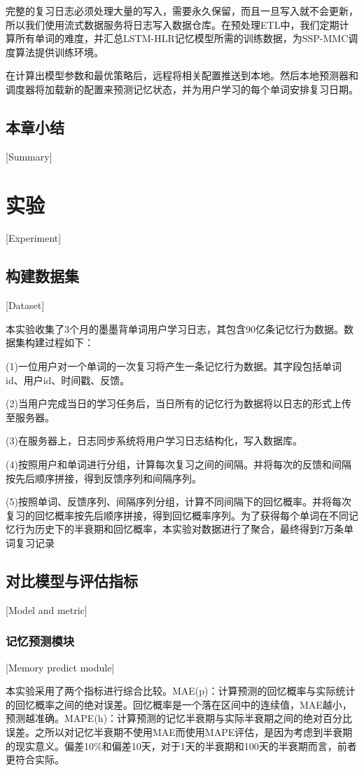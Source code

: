 完整的复习日志必须处理大量的写入，需要永久保留，而且一旦写入就不会更新，所以我们使用流式数据服务将日志写入数据仓库。在预处理ETL中，我们定期计算所有单词的难度，并汇总LSTM-HLR记忆模型所需的训练数据，为SSP-MMC调度算法提供训练环境。

在计算出模型参数和最优策略后，远程将相关配置推送到本地。然后本地预测器和调度器将加载新的配置来预测记忆状态，并为用户学习的每个单词安排复习日期。

\section{本章小结}[Summary]

\chapter{实验}[Experiment]

\section{构建数据集}[Dataset]

本实验收集了3个月的墨墨背单词用户学习日志，其包含90亿条记忆行为数据。数据集构建过程如下：

(1)一位用户对一个单词的一次复习将产生一条记忆行为数据。其字段包括单词id、用户id、时间戳、反馈。

(2)当用户完成当日的学习任务后，当日所有的记忆行为数据将以日志的形式上传至服务器。

(3)在服务器上，日志同步系统将用户学习日志结构化，写入数据库。

(4)按照用户和单词进行分组，计算每次复习之间的间隔。并将每次的反馈和间隔按先后顺序拼接，得到反馈序列和间隔序列。

(5)按照单词、反馈序列、间隔序列分组，计算不同间隔下的回忆概率。并将每次复习的回忆概率按先后顺序拼接，得到回忆概率序列。为了获得每个单词在不同记忆行为历史下的半衰期和回忆概率，本实验对数据进行了聚合，最终得到7万条单词复习记录

\section{对比模型与评估指标}[Model and metric]

\subsection{记忆预测模块}[Memory predict module]

本实验采用了两个指标进行综合比较。MAE(p)：计算预测的回忆概率与实际统计的回忆概率之间的绝对误差。回忆概率是一个落在区间中的连续值，MAE越小，预测越准确。MAPE(h)：计算预测的记忆半衰期与实际半衰期之间的绝对百分比误差。之所以对记忆半衰期不使用MAE而使用MAPE评估，是因为考虑到半衰期的现实意义。偏差10\%和偏差10天，对于1天的半衰期和100天的半衰期而言，前者更符合实际。

